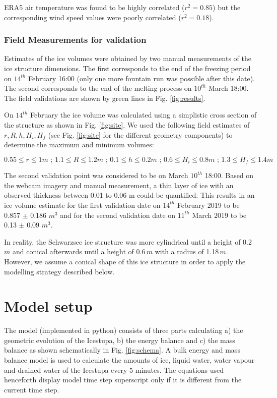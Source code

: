\documentclass[utf8]{frontiersSCNS} %
\begin{document}
ERA5 air temperature was found to be highly correlated ($r^2 = 0.85$)
but the corresponding wind speed values were poorly correlated ($r^2 = 0.18$). 
 

\subsubsection{Field Measurements for validation} \label{section:validation} Estimates of the ice volumes were obtained
by two manual measurements of the ice structure dimensions. The first corresponds to the end of the freezing period on
$14^{th}$ February 16:00 (only one more fountain run was possible after this date). The second corresponds to the end of
the melting process on $10^{th}$ March 18:00. The field validations are shown by green lines in Fig.
\ref{fig:results}.

On $14^{th}$ February the ice volume was calculated using a simplistic cross section of the structure as shown in Fig.
\ref{fig:site}. We used the following field estimates of $r, R, h, H_i, H_f$ (see Fig. \ref{fig:site} for the
different geometry components) to determine the maximum and minimum volumes:

\begin{equation} 0.55\leq r\leq 1 m\textit{ ; }1.1\leq R\leq 1.2 m\textit{ ; }0.1\leq h\leq 0.2 m\textit{ ; }0.6\leq
H_i\leq 0.8 m\textit{ ; }1.3\leq H_f\leq 1.4 m \end{equation}

The second validation point was considered to be on March $10^{th}$ 18:00.  Based on the webcam imagery and manual
measurement, a thin layer of ice with an observed thickness between 0.01 to 0.06 m could be quantified. This results in
an ice volume estimate for the first validation date on $14^{th}$ February 2019 to be 0.857 $\pm$ 0.186 $m^{3}$ and for
the second validation date on $11^{th}$ March 2019 to be 0.13 $\pm$ 0.09 $m^{3}$.

In reality, the Schwarzsee ice structure was more cylindrical until a height of 0.2\,$m$ and conical afterwards until a
height of 0.6\,$m$ with a radius of 1.18\,$m$. However, we assume a conical shape of this ice structure in order to
apply the modelling strategy described below.

\section{Model setup}

The model (implemented in python) consists of three parts calculating a) the geometric evolution of the Icestupa, b)
the energy balance and c) the mass balance as shown schematically in Fig. \ref{fig:schema}. A bulk energy and mass
balance model is used to calculate the amounts of ice, liquid water, water vapour and drained water of the Icestupa
every 5 minutes. The equations used henceforth display model time step superscript only if it is different from the
current time step.
\end{document}
